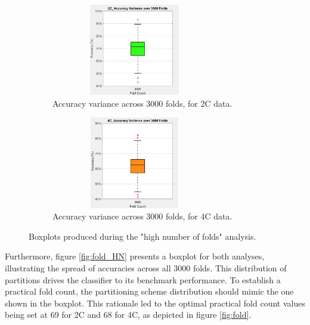 \begin{figure}[htbp]
 	\centering
	\begin{subfigure}{0.49\textwidth}
		\centering
		\includegraphics[width = 0.8\textwidth, height = 4cm]{assets/images/box_2C_3000.png}
		\caption{Accuracy variance across 3000 folds, for \gls{2C} data.}
		\label{fig:2C_3000}
	\end{subfigure}
	\hfill
	\begin{subfigure}{0.49\textwidth}
		\centering
	 	\includegraphics[width = 0.8\textwidth, height = 4cm]{assets/images/box_4C_3000.png}
		\caption{Accuracy variance across 3000 folds, for \gls{4C} data.}
		\label{fig:4C_3000}
	\end{subfigure}
	\caption[Boxplots of Accuracies across 3000 Folds]{Boxplots produced during the "high number of folds" analysis.}
 	\label{fig:fold_HN}
\end{figure}

Furthermore, figure \autoref{fig:fold_HN} presents a boxplot for both analyses, illustrating the spread of accuracies across all 3000 folds. This distribution of partitions drives the classifier to its benchmark performance. To establish a practical fold count, the partitioning scheme distribution should mimic the one shown in the boxplot. This rationale led to the optimal practical fold count values being set at 69 for \gls{2C} and 68 for \gls{4C}, as depicted in figure \autoref{fig:fold}.

